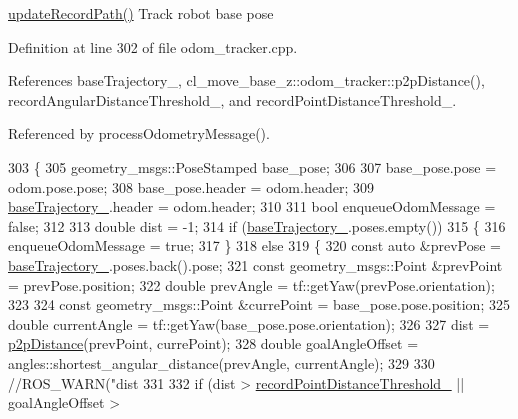\hyperlink{classcl__move__base__z_1_1odom__tracker_1_1OdomTracker_a77a66083573c6bef726d77447fb53349}{update\+Record\+Path()} Track robot base pose 

Definition at line 302 of file odom\+\_\+tracker.\+cpp.



References base\+Trajectory\+\_\+, cl\+\_\+move\+\_\+base\+\_\+z\+::odom\+\_\+tracker\+::p2p\+Distance(), record\+Angular\+Distance\+Threshold\+\_\+, and record\+Point\+Distance\+Threshold\+\_\+.



Referenced by process\+Odometry\+Message().


\begin{DoxyCode}
303 \{
305     geometry\_msgs::PoseStamped base\_pose;
306 
307     base\_pose.pose = odom.pose.pose;
308     base\_pose.header = odom.header;
309     \hyperlink{classcl__move__base__z_1_1odom__tracker_1_1OdomTracker_a466d18a86df049f0f680e043bb5ea91f}{baseTrajectory\_}.header = odom.header;
310 
311     \textcolor{keywordtype}{bool} enqueueOdomMessage = \textcolor{keyword}{false};
312 
313     \textcolor{keywordtype}{double} dist = -1;
314     \textcolor{keywordflow}{if} (\hyperlink{classcl__move__base__z_1_1odom__tracker_1_1OdomTracker_a466d18a86df049f0f680e043bb5ea91f}{baseTrajectory\_}.poses.empty())
315     \{
316         enqueueOdomMessage = \textcolor{keyword}{true};
317     \}
318     \textcolor{keywordflow}{else}
319     \{
320         \textcolor{keyword}{const} \textcolor{keyword}{auto} &prevPose = \hyperlink{classcl__move__base__z_1_1odom__tracker_1_1OdomTracker_a466d18a86df049f0f680e043bb5ea91f}{baseTrajectory\_}.poses.back().pose;
321         \textcolor{keyword}{const} geometry\_msgs::Point &prevPoint = prevPose.position;
322         \textcolor{keywordtype}{double} prevAngle = tf::getYaw(prevPose.orientation);
323 
324         \textcolor{keyword}{const} geometry\_msgs::Point &currePoint = base\_pose.pose.position;
325         \textcolor{keywordtype}{double} currentAngle = tf::getYaw(base\_pose.pose.orientation);
326 
327         dist = \hyperlink{namespacecl__move__base__z_1_1odom__tracker_a501582a760a02ce0069d95bfc67ca973}{p2pDistance}(prevPoint, currePoint);
328         \textcolor{keywordtype}{double} goalAngleOffset = angles::shortest\_angular\_distance(prevAngle, currentAngle);
329 
330         \textcolor{comment}{//ROS\_WARN("dist %
331 
332         \textcolor{keywordflow}{if} (dist > \hyperlink{classcl__move__base__z_1_1odom__tracker_1_1OdomTracker_a3a1173716d527bd182d04656491e01dd}{recordPointDistanceThreshold\_} || goalAngleOffset > 
}
\end{DoxyCode}
